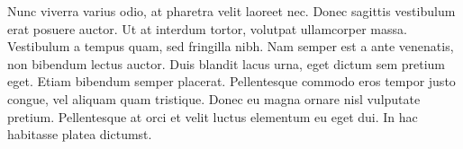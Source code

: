 Nunc viverra varius odio, at pharetra velit laoreet nec. Donec sagittis vestibulum erat posuere auctor. Ut at interdum tortor, volutpat ullamcorper massa. Vestibulum a tempus quam, sed fringilla nibh. Nam semper est a ante venenatis, non bibendum lectus auctor. Duis blandit lacus urna, eget dictum sem pretium eget. Etiam bibendum semper placerat. Pellentesque commodo eros tempor justo congue, vel aliquam quam tristique. Donec eu magna ornare nisl vulputate pretium. Pellentesque at orci et velit luctus elementum eu eget dui. In hac habitasse platea dictumst.